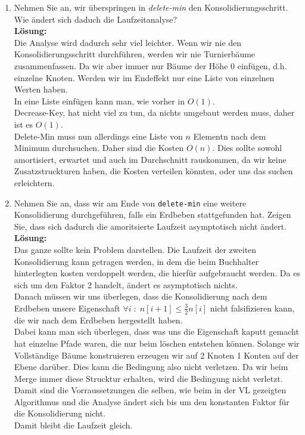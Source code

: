 \documentclass[11pt,a4paper,ngerman]{article}
\begin{document}
\begin{enumerate}[\bfseries (a)]

\item Nehmen Sie an, wir überspringen in \emph{delete-min} den Konsolidierungsschritt.\\
Wie ändert sich daduch die Laufzeitanalyse?\\

\textbf{Lösung:}\\

Die Analyse wird dadurch sehr viel leichter. Wenn wir nie den Konsolidierungsschritt durchführen, werden wir nie Turnierbäume zusammenfassen. Da wir aber immer nur Bäume der Höhe 0 einfügen, d.h. einzelne Knoten. Werden wir im Endeffekt nur eine Liste von einzelnen Werten haben.\\

In eine Liste einfügen kann man, wie vorher in $O(1)$.\\
Decrease-Key, hat nicht viel zu tun, da nichts umgebaut werden muss, daher ist es $O(1)$.\\
Delete-Min muss nun allerdings eine Liste von $n$ Elementn nach dem Minimum durchsuchen. Daher sind die Kosten $O(n)$. Dies sollte sowohl amortisiert, erwartet und auch im Durchschnitt rauskommen, da wir keine Zusatzstruckturen haben, die Kosten verteilen könnten, oder uns das suchen erleichtern.

\item Nehmen Sie an, dass wir am Ende von \texttt{delete-min} eine weitere Konsolidierung durchgeführen, falls ein Erdbeben stattgefunden hat. Zeigen Sie, dass sich dadurch die amoritsierte Laufzeit asymptotisch nicht ändert.\\

\textbf{Lösung:}\\

Das ganze sollte kein Problem darstellen. Die Laufzeit der zweiten Konsolidierung kann getragen werden, in dem die beim Buchhalter hinterlegten kosten verdoppelt werden, die hierfür aufgebraucht werden. Da es sich um den Faktor 2 handelt, ändert es asymptotisch nichts.\\

Danach müssen wir uns überlegen, dass die Konsolidierung nach dem Erdbeben unsere Eigenschaft $\forall i \; : \; n[i+1] \leq \frac{3}{2} n[i]$ nicht falsifizieren kann, die wir nach dem Erdbeben hergestellt haben.\\

Dabei kann man sich überlegen, dass was uns die Eigenschaft kaputt gemacht hat einzelne Pfade waren, die nur beim löschen entstehen können. Solange wir Vollständige Bäume konstruieren erzeugen wir auf 2 Knoten 1 Konten auf der Ebene darüber. Dies kann die Bedingung also nicht verletzen. Da wir beim Merge immer diese Strucktur erhalten, wird die Bedingung nicht verletzt. Damit sind die Vorraussetzungen die selben, wie beim in der VL gezeigten Algorithmus und die Analyse ändert sich bis um den konstanten Faktor für die Konsolidierung nicht.\\

Damit bleibt die Laufzeit gleich.

\end{enumerate}
\end{document}

